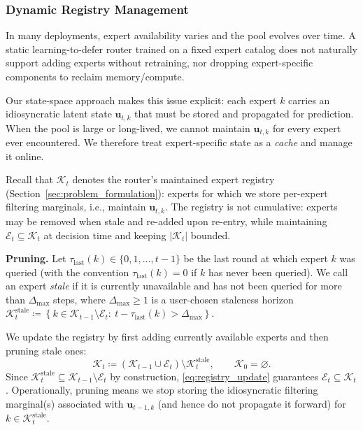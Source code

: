 \subsubsection{Dynamic Registry Management}
\label{sec:registry}

In many deployments, expert availability varies and the pool evolves over time. A static
learning-to-defer router \citep{madras2018predict, mozannar2021consistent} trained on a fixed expert catalog does not naturally support
adding experts
without retraining, nor dropping expert-specific components to reclaim memory/compute.

Our state-space approach makes this issue explicit: each expert \(k\) carries an idiosyncratic latent
state \(\mathbf{u}_{t,k}\) that must be stored and propagated for prediction. When the pool is large
or long-lived, we cannot maintain \(\mathbf{u}_{t,k}\) for every expert ever encountered. We therefore
treat expert-specific state as a \emph{cache} and manage it online.

Recall that \(\mathcal{K}_t\) denotes the router's maintained expert registry
(Section~\ref{sec:problem_formulation}): experts for which we store per-expert filtering marginals,
i.e., maintain \(\mathbf{u}_{t,k}\). The registry is not cumulative: experts may be removed when stale
and re-added upon re-entry, while maintaining \(\mathcal{E}_t\subseteq \mathcal{K}_t\) at decision time
and keeping \(|\mathcal{K}_t|\) bounded.

\textbf{Pruning.}
Let \(\tau_{\mathrm{last}}(k)\in\{0,1,\dots,t-1\}\) be the last round at which expert \(k\) was queried
(with the convention \(\tau_{\mathrm{last}}(k)=0\) if \(k\) has never been queried).
We call an expert \emph{stale} if it is currently unavailable and has not been queried for more than
\(\Delta_{\max}\) steps, where \(\Delta_{\max}\ge 1\) is a user-chosen staleness horizon $\mathcal{K}^{\mathrm{stale}}_t
\coloneqq
\left\{k\in \mathcal{K}_{t-1}\setminus \mathcal{E}_t:\ t-\tau_{\mathrm{last}}(k)>\Delta_{\max}\right\}.$

We update the registry by first adding currently available experts and then pruning stale ones:
\begin{equation}
\label{eq:registry_update}
\mathcal{K}_t \coloneqq (\mathcal{K}_{t-1}\cup \mathcal{E}_t)\setminus \mathcal{K}^{\mathrm{stale}}_t,
\qquad \mathcal{K}_0=\varnothing .
\end{equation}
Since \(\mathcal{K}^{\mathrm{stale}}_t\subseteq \mathcal{K}_{t-1}\setminus \mathcal{E}_t\) by
construction, \eqref{eq:registry_update} guarantees \(\mathcal{E}_t\subseteq \mathcal{K}_t\).
Operationally, pruning means we stop storing the idiosyncratic filtering marginal(s) associated with
\(\mathbf{u}_{t-1,k}\) (and hence do not propagate it forward) for \(k\in\mathcal{K}^{\mathrm{stale}}_t\).

